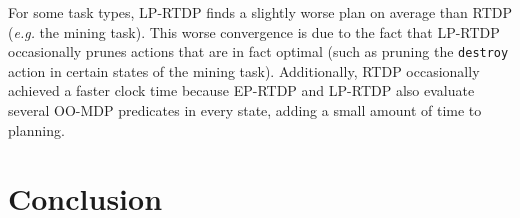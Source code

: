 \documentclass[11pt]{article}
\begin{document}
For some task types, LP-RTDP finds a slightly worse plan on average than
RTDP ({\em e.g.} the mining task). This worse convergence is due to the fact that LP-RTDP
occasionally prunes actions that are in fact optimal (such as
pruning the \texttt{destroy} action in certain states of the mining task).
Additionally, RTDP occasionally achieved a faster clock time because EP-RTDP and LP-RTDP also evaluate several OO-MDP predicates in every state, adding a small amount of time to planning.






\section{Conclusion}



\end{document}
